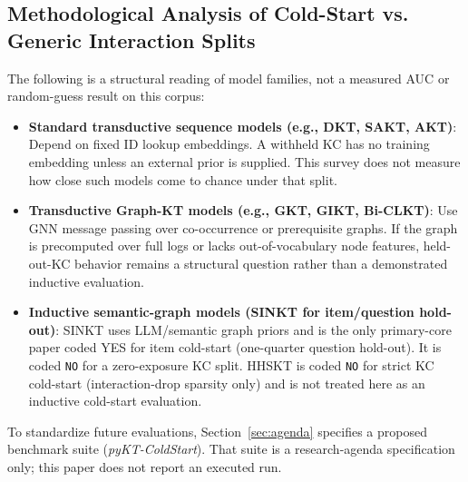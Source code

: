 \documentclass[lettersize,journal]{IEEEtran}
\begin{document}
\subsection{Methodological Analysis of Cold-Start vs. Generic Interaction Splits}
The following is a structural reading of model families, not a measured AUC or random-guess result on this corpus:
\begin{itemize}
    \item \textbf{Standard transductive sequence models (e.g., DKT, SAKT, AKT)}: Depend on fixed ID lookup embeddings. A withheld KC has no training embedding unless an external prior is supplied. This survey does not measure how close such models come to chance under that split.
    \item \textbf{Transductive Graph-KT models (e.g., GKT, GIKT, Bi-CLKT)}: Use GNN message passing over co-occurrence or prerequisite graphs. If the graph is precomputed over full logs or lacks out-of-vocabulary node features, held-out-KC behavior remains a structural question rather than a demonstrated inductive evaluation.
    \item \textbf{Inductive semantic-graph models (SINKT for item/question hold-out)}: SINKT \cite{KT044_SINKT_2024} uses LLM/semantic graph priors and is the only primary-core paper coded YES for item cold-start (one-quarter question hold-out). It is coded \texttt{NO} for a zero-exposure KC split. HHSKT \cite{KT035_HHSKT_2023} is coded \texttt{NO} for strict KC cold-start (interaction-drop sparsity only) and is not treated here as an inductive cold-start evaluation.
\end{itemize}

To standardize future evaluations, Section~\ref{sec:agenda} specifies a proposed benchmark suite (\emph{pyKT-ColdStart}). That suite is a research-agenda specification only; this paper does not report an executed run.
\end{document}
